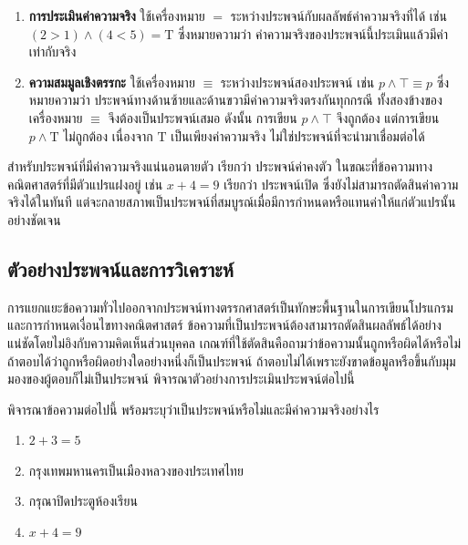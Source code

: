 \begin{enumerate}
    \item \textbf{การประเมินค่าความจริง} ใช้เครื่องหมาย $=$ ระหว่างประพจน์กับผลลัพธ์ค่าความจริงที่ได้ เช่น $(2>1) \land (4<5) = \text{T}$ ซึ่งหมายความว่า ค่าความจริงของประพจน์นี้ประเมินแล้วมีค่าเท่ากับจริง
    
    \item \textbf{ความสมมูลเชิงตรรกะ} ใช้เครื่องหมาย $\equiv$ ระหว่างประพจน์สองประพจน์ เช่น $p \land \top \equiv p$ ซึ่งหมายความว่า ประพจน์ทางด้านซ้ายและด้านขวามีค่าความจริงตรงกันทุกกรณี ทั้งสองข้างของเครื่องหมาย $\equiv$ จึงต้องเป็นประพจน์เสมอ ดังนั้น การเขียน $p \land \top$ จึงถูกต้อง แต่การเขียน $p \land \text{T}$ ไม่ถูกต้อง เนื่องจาก $\text{T}$ เป็นเพียงค่าความจริง ไม่ใช่ประพจน์ที่จะนำมาเชื่อมต่อได้
\end{enumerate}

สำหรับประพจน์ที่มีค่าความจริงแน่นอนตายตัว เรียกว่า ประพจน์ค่าคงตัว ในขณะที่ข้อความทางคณิตศาสตร์ที่มีตัวแปรแฝงอยู่ เช่น $x + 4 = 9$ เรียกว่า ประพจน์เปิด ซึ่งยังไม่สามารถตัดสินค่าความจริงได้ในทันที แต่จะกลายสภาพเป็นประพจน์ที่สมบูรณ์เมื่อมีการกำหนดหรือแทนค่าให้แก่ตัวแปรนั้นอย่างชัดเจน

\subsection{ตัวอย่างประพจน์และการวิเคราะห์}

การแยกแยะข้อความทั่วไปออกจากประพจน์ทางตรรกศาสตร์เป็นทักษะพื้นฐานในการเขียนโปรแกรมและการกำหนดเงื่อนไขทางคณิตศาสตร์ ข้อความที่เป็นประพจน์ต้องสามารถตัดสินผลลัพธ์ได้อย่างแน่ชัดโดยไม่อิงกับความคิดเห็นส่วนบุคคล เกณฑ์ที่ใช้ตัดสินคือถามว่าข้อความนั้นถูกหรือผิดได้หรือไม่ ถ้าตอบได้ว่าถูกหรือผิดอย่างใดอย่างหนึ่งก็เป็นประพจน์ ถ้าตอบไม่ได้เพราะยังขาดข้อมูลหรือขึ้นกับมุมมองของผู้ตอบก็ไม่เป็นประพจน์ พิจารณาตัวอย่างการประเมินประพจน์ต่อไปนี้~\parencite{hurley2024logic}

\begin{ex}
\label{ex:proposition-check}
พิจารณาข้อความต่อไปนี้ พร้อมระบุว่าเป็นประพจน์หรือไม่และมีค่าความจริงอย่างไร

\begin{enumerate}
    \item $2 + 3 = 5$
    \item กรุงเทพมหานครเป็นเมืองหลวงของประเทศไทย
    \item กรุณาปิดประตูห้องเรียน
    \item $x + 4 = 9$
\end{enumerate}
\end{ex}

